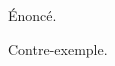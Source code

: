 \documentclass{beamer}
\begin{document}
\begin{frame}
  \begin{proposition}Énoncé.\end{proposition} %
  \begin{example*}Contre-exemple.\end{example*}
\end{frame}
\end{document}
